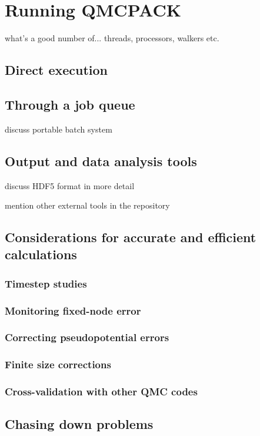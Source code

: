 \chapter{Running QMCPACK}
what's a good number of... threads, processors, walkers etc.
\section{Direct execution}
\section{Through a job queue}
discuss portable batch system
\section{Output and data analysis tools}
discuss HDF5 format in more detail

mention other external tools in the repository
\section{Considerations for accurate and efficient calculations}
\subsection{Timestep studies}
\subsection{Monitoring fixed-node error}
\subsection{Correcting pseudopotential errors}
\subsection{Finite size corrections}
\subsection{Cross-validation with other QMC codes}
\section{Chasing down problems}


